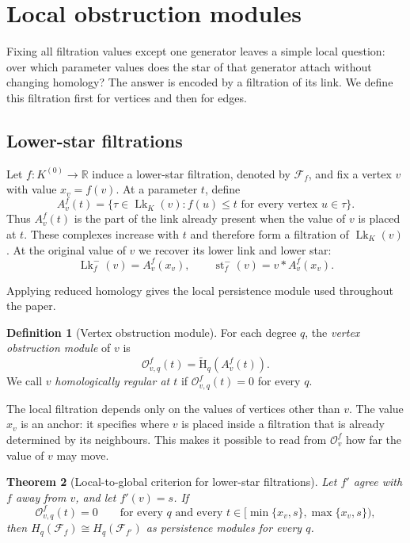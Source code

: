 \documentclass[11pt,letterpaper]{article}
\newtheorem{theorem}{Theorem}[section]
\theoremstyle{definition}
\newtheorem{definition}[theorem]{Definition}
\newcommand{\redH}{\widetilde{\mathrm H}}
\newcommand{\lk}{\operatorname{Lk}}
\newcommand{\Oc}{\mathcal O}
\begin{document}
\section{Local obstruction modules}\label{sec:obstruction}

Fixing all filtration values except one generator leaves a simple local
question: over which parameter values does the star of that generator attach
without changing homology? The answer is encoded by a filtration of its link.
We define this filtration first for vertices and then for edges.

\subsection{Lower-star filtrations}

Let $f:K^{(0)}\to\mathbb R$ induce a lower-star filtration, denoted by
$\mathcal F_f$, and fix a vertex $v$ with value $x_v=f(v)$. At a parameter
$t$, define
$$
A_v^f(t)
=\{\tau\in\lk_K(v):f(u)\leq t
  \text{ for every vertex }u\in\tau\}.
$$
Thus $A_v^f(t)$ is the part of the link already present when the value of $v$
is placed at $t$. These complexes increase with $t$ and therefore form a
filtration of $\lk_K(v)$. At the original value of $v$ we recover its lower
link and lower star:
$$
\lk_f^-(v)=A_v^f(x_v),
\qquad
\operatorname{st}_f^-(v)=v*A_v^f(x_v).
$$

Applying reduced homology gives the local persistence module used throughout
the paper.

\begin{definition}[Vertex obstruction module]
\label{def:vertex-obstruction}
For each degree $q$, the \emph{vertex obstruction module} of $v$ is
$$
\Oc_{v,q}^f(t)=\redH_q(A_v^f(t)).
$$
We call $v$ \emph{homologically regular at $t$} if
$\Oc_{v,q}^f(t)=0$ for every $q$.
\end{definition}

The local filtration depends only on the values of vertices other than $v$.
The value $x_v$ is an anchor: it specifies where $v$ is placed inside a
filtration that is already determined by its neighbours. This makes it
possible to read from $\Oc_v^f$ how far the value of $v$ may move.

\begin{theorem}[Local-to-global criterion for lower-star filtrations]
\label{thm:ls-local-global}
Let $f'$ agree with $f$ away from $v$, and let $f'(v)=s$. If
$$
\Oc_{v,q}^f(t)=0
\qquad
\text{for every $q$ and every }
t\in[\min\{x_v,s\},\max\{x_v,s\}),
$$
then $H_q(\mathcal F_f)\cong H_q(\mathcal F_{f'})$ as persistence modules
for every $q$.
\end{theorem}
\end{document}
